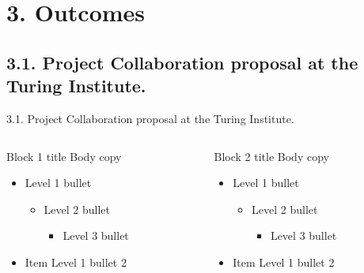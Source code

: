 \documentclass[t]{beamer}
\begin{document}
\section{3. Outcomes}
\subsection{3.1. Project Collaboration proposal at the Turing Institute.}
\begin{frame}{3.1. Project Collaboration proposal at the Turing Institute.}
	\begin{columns}[T,totalwidth=\textwidth]
  		\begin{column}{0.45\textwidth}
  			\begin{block}{Block 1 title}
    				Body copy
    				\begin{itemize}    
    					\item Level 1 bullet
  					\begin{itemize}
  						\item Level 2 bullet
  						\begin{itemize}
  							\item Level 3 bullet
  						\end{itemize}
  					\end{itemize}
    					\item Item Level 1 bullet 2
    				\end{itemize}  
			\end{block}
  		\end{column} %
  		\begin{column}{0.45\textwidth}
  			\begin{block}{Block 2 title}
    				Body copy
    				\begin{itemize}    
    					\item Level 1 bullet
  					\begin{itemize}
  						\item Level 2 bullet
  						\begin{itemize}
  							\item Level 3 bullet
  						\end{itemize}
  					\end{itemize}
    					\item Item Level 1 bullet 2
    				\end{itemize}  
			\end{block}
  		\end{column}%
	\end{columns}
\end{frame}
\end{document}

